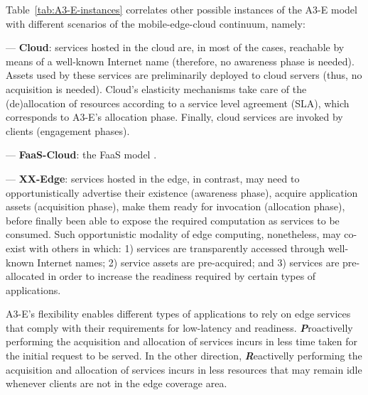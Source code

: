 

Table~\ref{tab:A3-E-instances} correlates other possible instances of the A3-E model with different scenarios of the mobile-edge-cloud continuum, namely: 

--- \textbf{Cloud}: services hosted in the cloud are, in most of the cases, reachable by means of a well-known Internet name (therefore, no awareness phase is needed). Assets used by these services are preliminarily deployed to cloud servers (thus, no acquisition is needed). Cloud's elasticity mechanisms take care of the (de)allocation of resources according to a service level agreement (SLA), which corresponds to A3-E's allocation phase. Finally, cloud services are invoked by clients (engagement phases). 

--- \textbf{FaaS-Cloud}: the FaaS model . 

--- \textbf{XX-Edge}: services hosted in the edge, in contrast, may need to opportunistically advertise their existence (awareness phase), acquire application assets (acquisition phase), make them ready for invocation (allocation phase), before finally been able to expose the required computation as services to be consumed. Such opportunistic modality of edge computing, nonetheless, may co-exist with others in which: 1) services are transparently accessed through well-known Internet names; 2) service assets are pre-acquired; and 3) services are pre-allocated in order to increase the readiness required by certain types of applications. 

A3-E's flexibility enables different types of applications to rely on edge services that comply with their requirements for low-latency and readiness. \textbf{\textit{P}}roactivelly performing the acquisition and allocation of services incurs in less time taken for the initial request to be served. In the other direction, \textbf{\textit{R}}eactivelly performing the acquisition and allocation of services incurs in less resources that may remain idle whenever clients are not in the edge coverage area. 

